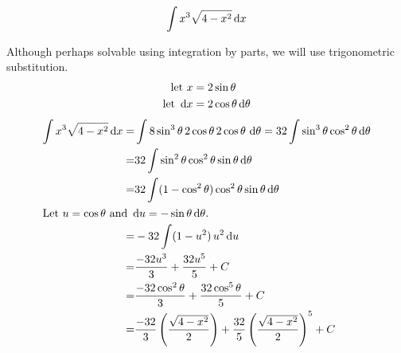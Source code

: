 %
\begin{ex}
  \[ \int x^{3} \sqrt {4-x^2} \,\mathrm{d} x \]
  \begin{sol} Although perhaps solvable using integration by parts, we will use trigonometric substitution.
  \begin{align*}
    \text{let }  x &= 2 \sin{\theta} \\ \text{let } \,\mathrm{d} x &= 2\cos \theta \,\mathrm{d} \theta
  \end{align*}
  \begin{align*}
    \int x^{3} \sqrt {4-x^2} \,\mathrm{d} x
    =&\int 8\sin^3 \theta \, 2\cos\theta \, 2\cos\theta \, \,\mathrm{d}\theta
   =32 \int \sin^{3}\theta\cos^{2} \theta \,\mathrm{d}\theta \\
   =& 32 \int \sin^{2}\theta\cos^{2} \theta\sin \theta \,\mathrm{d}\theta \\
   =& 32 \int (1-\cos^{2}\theta) \cos^{2} \theta\sin \theta \,\mathrm{d}\theta \\
   \intertext{Let $u=\cos\theta$ and $\,\mathrm{d} u = -\sin \theta \,\mathrm{d} \theta$.}
   =&-32 \int (1-u^{2})\,u^{2}\,\mathrm{d} u \\
   =&\frac {-32u^3}{3}+\frac{32u^5}{5}+C \\
   =&\frac{-32\cos^{2}\theta}{3}+\frac{32\cos^{5}\theta}{5}+C \\
   =&\frac {-32}{3} \left(\frac{\sqrt{4-x^2}}{2}\right)+\frac {32}{5} \left(\frac{\sqrt{4-x^2}}{2}\right)^5+C \\
 \end{align*}
 \end{sol}
\end{ex}
%

